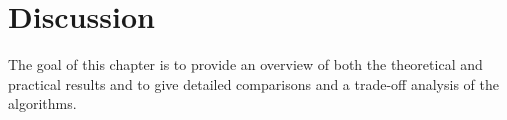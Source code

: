 \section{Discussion}

The goal of this chapter is to provide an overview of both the theoretical and practical results and to give detailed comparisons and a trade-off analysis of the algorithms.